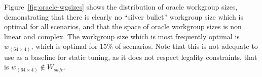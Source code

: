 \documentclass[nonatbib,preprint,10pt]{sigplanconf}
\begin{document}
Figure~\ref{fig:oracle-wgsizes} shows the distribution of oracle
workgroup sizes, demonstrating that there is clearly no ``silver
bullet'' workgroup size which is optimal for all scenarios, and that
the space of oracle workgroup sizes is non linear and complex. The
workgroup size which is most frequently optimal is
$w_{(64 \times 4)}$, which is optimal for 15\% of scenarios. Note that
this is not adequate to use as a baseline for static tuning, as it
does not respect legality constraints, that is
$w_{(64 \times 4)} \not\in W_{safe}$.


\end{document}
